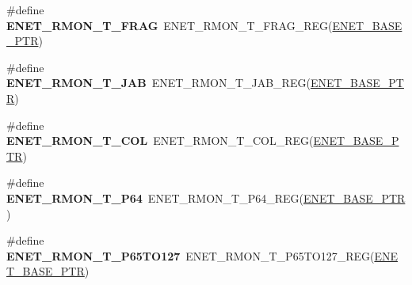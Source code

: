 \begin{DoxyCompactItemize}
\item 
\hypertarget{group___e_n_e_t___register___accessor___macros_ga79c1cf9a47efaba14d5ab93b7e760702}{}\#define {\bfseries E\+N\+E\+T\+\_\+\+R\+M\+O\+N\+\_\+\+T\+\_\+\+F\+R\+A\+G}~E\+N\+E\+T\+\_\+\+R\+M\+O\+N\+\_\+\+T\+\_\+\+F\+R\+A\+G\+\_\+\+R\+E\+G(\hyperlink{group___e_n_e_t___peripheral_gab64a2d991cc2bd76dd55ee25a52dcb5c}{E\+N\+E\+T\+\_\+\+B\+A\+S\+E\+\_\+\+P\+T\+R})\label{group___e_n_e_t___register___accessor___macros_ga79c1cf9a47efaba14d5ab93b7e760702}

\item 
\hypertarget{group___e_n_e_t___register___accessor___macros_gab429b1b2658b8dc8f8900cc50243e7b2}{}\#define {\bfseries E\+N\+E\+T\+\_\+\+R\+M\+O\+N\+\_\+\+T\+\_\+\+J\+A\+B}~E\+N\+E\+T\+\_\+\+R\+M\+O\+N\+\_\+\+T\+\_\+\+J\+A\+B\+\_\+\+R\+E\+G(\hyperlink{group___e_n_e_t___peripheral_gab64a2d991cc2bd76dd55ee25a52dcb5c}{E\+N\+E\+T\+\_\+\+B\+A\+S\+E\+\_\+\+P\+T\+R})\label{group___e_n_e_t___register___accessor___macros_gab429b1b2658b8dc8f8900cc50243e7b2}

\item 
\hypertarget{group___e_n_e_t___register___accessor___macros_ga4e024726e7b145f433759bf4e343bead}{}\#define {\bfseries E\+N\+E\+T\+\_\+\+R\+M\+O\+N\+\_\+\+T\+\_\+\+C\+O\+L}~E\+N\+E\+T\+\_\+\+R\+M\+O\+N\+\_\+\+T\+\_\+\+C\+O\+L\+\_\+\+R\+E\+G(\hyperlink{group___e_n_e_t___peripheral_gab64a2d991cc2bd76dd55ee25a52dcb5c}{E\+N\+E\+T\+\_\+\+B\+A\+S\+E\+\_\+\+P\+T\+R})\label{group___e_n_e_t___register___accessor___macros_ga4e024726e7b145f433759bf4e343bead}

\item 
\hypertarget{group___e_n_e_t___register___accessor___macros_ga55f52465e75b039a863770db93c2fddd}{}\#define {\bfseries E\+N\+E\+T\+\_\+\+R\+M\+O\+N\+\_\+\+T\+\_\+\+P64}~E\+N\+E\+T\+\_\+\+R\+M\+O\+N\+\_\+\+T\+\_\+\+P64\+\_\+\+R\+E\+G(\hyperlink{group___e_n_e_t___peripheral_gab64a2d991cc2bd76dd55ee25a52dcb5c}{E\+N\+E\+T\+\_\+\+B\+A\+S\+E\+\_\+\+P\+T\+R})\label{group___e_n_e_t___register___accessor___macros_ga55f52465e75b039a863770db93c2fddd}

\item 
\hypertarget{group___e_n_e_t___register___accessor___macros_ga76588cb610a5268fb112b219d3756934}{}\#define {\bfseries E\+N\+E\+T\+\_\+\+R\+M\+O\+N\+\_\+\+T\+\_\+\+P65\+T\+O127}~E\+N\+E\+T\+\_\+\+R\+M\+O\+N\+\_\+\+T\+\_\+\+P65\+T\+O127\+\_\+\+R\+E\+G(\hyperlink{group___e_n_e_t___peripheral_gab64a2d991cc2bd76dd55ee25a52dcb5c}{E\+N\+E\+T\+\_\+\+B\+A\+S\+E\+\_\+\+P\+T\+R})\label{group___e_n_e_t___register___accessor___macros_ga76588cb610a5268fb112b219d3756934}


\end{DoxyCompactItemize}
